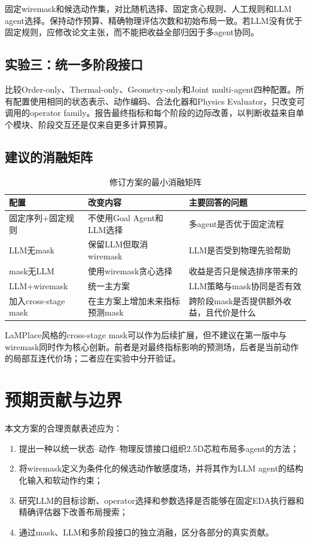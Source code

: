 \documentclass[UTF8,a4paper,12pt]{ctexart}
\begin{document}
固定wiremask和候选动作集，对比随机选择、固定贪心规则、人工规则和LLM agent选择。保持动作预算、精确物理评估次数和初始布局一致。若LLM没有优于固定规则，应修改论文主张，而不能把收益全部归因于多agent协同。

\subsection{实验三：统一多阶段接口}

比较Order-only、Thermal-only、Geometry-only和Joint multi-agent四种配置。所有配置使用相同的状态表示、动作编码、合法化器和Physics Evaluator，只改变可调用的operator family。报告最终指标和每个阶段的边际改善，以判断收益来自单个模块、阶段交互还是仅来自更多计算预算。

\subsection{建议的消融矩阵}

\begin{table}[htbp]
\centering
\caption{修订方案的最小消融矩阵}
\begin{tabularx}{\textwidth}{>{\raggedright\arraybackslash}p{3.1cm}X X}
\toprule
配置 & 改变内容 & 主要回答的问题 \\
\midrule
固定序列+固定规则 & 不使用Goal Agent和LLM选择 & 多agent是否优于固定流程 \\
LLM无mask & 保留LLM但取消wiremask & LLM是否受到物理先验帮助 \\
mask无LLM & 使用wiremask贪心选择 & 收益是否只是候选排序带来的 \\
LLM+wiremask & 统一主方案 & LLM策略与mask协同是否有效 \\
加入cross-stage mask & 在主方案上增加未来指标预测mask & 跨阶段mask是否提供额外收益，且代价是什么 \\
\bottomrule
\end{tabularx}
\end{table}

LaMPlace风格的cross-stage mask可以作为后续扩展，但不建议在第一版中与wiremask同时作为核心创新。前者是对最终指标影响的预测场，后者是当前动作的局部互连代价场；二者应在实验中分开验证。

\section{预期贡献与边界}

本文方案的合理贡献表述应为：

\begin{enumerate}[leftmargin=2.5em]
  \item 提出一种以统一状态--动作--物理反馈接口组织2.5D芯粒布局多agent的方法；
  \item 将wiremask定义为条件化的候选动作敏感度场，并将其作为LLM agent的结构化输入和软动作约束；
  \item 研究LLM的目标诊断、operator选择和参数选择是否能够在固定EDA执行器和精确评估器下改善布局搜索；
  \item 通过mask、LLM和多阶段接口的独立消融，区分各部分的真实贡献。
\end{enumerate}
\end{document}
